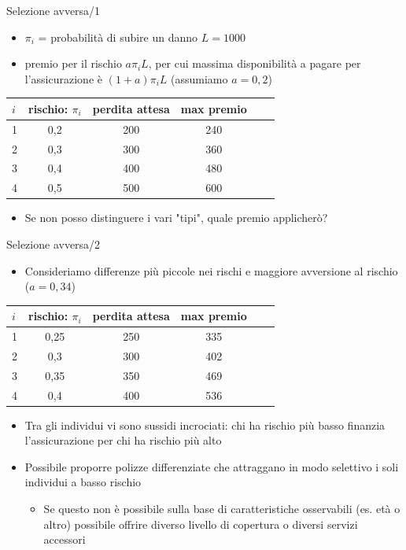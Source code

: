 \documentclass[aspectratio=64,11pt]{beamer}
\begin{document}
\begin{frame}{Selezione avversa/1}
\begin{itemize}
\item \(\pi_i\) = probabilità di subire un danno \(L=1000\)
\item premio per il rischio \(a\pi_iL\), per cui massima disponibilità a pagare per
l'assicurazione è \((1+a)\pi_iL\) (assumiamo \(a=0,2\))
\end{itemize}

\begin{center}
\begin{tabular}{lccccl}
  \toprule
  $i$&rischio: $\pi_i$&perdita attesa& max premio\\
  \midrule
  1 & 0,2 &200 & 240 \\
  2 & 0,3 &300 & 360 \\
  3 & 0,4 &400 & 480 \\
  4 & 0,5 &500 & 600 \\
  \bottomrule
\end{tabular}  
\end{center}

\begin{itemize}
\item Se non posso distinguere i vari "tipi", quale premio applicherò?
\end{itemize}
\end{frame}

\begin{frame}{Selezione avversa/2}
\begin{itemize}
\item Consideriamo differenze più piccole nei rischi e maggiore avversione al rischio (\(a=0,34\))
\end{itemize}

\begin{center}
\begin{tabular}{lccccl}
  \toprule
  $i$&rischio: $\pi_i$&perdita attesa& max premio\\
  \midrule
  1 & 0,25 &250 & 335 \\
  2 & 0,3 &300 & 402 \\
  3 & 0,35 &350 & 469 \\
  4 & 0,4 &400 & 536 \\
  \bottomrule
\end{tabular}
\end{center}

\begin{itemize}
\item Tra gli individui vi sono \alert{sussidi incrociati}: chi ha rischio più basso finanzia l'assicurazione per chi ha rischio più alto

\item Possibile proporre polizze differenziate che attraggano in modo selettivo i
soli individui a basso rischio
\begin{itemize}
\item Se questo non è possibile sulla base di caratteristiche osservabili (es. età
o altro) possibile offrire diverso livello di copertura o diversi servizi
accessori
\end{itemize}
\end{itemize}
\end{frame}
\end{document}

